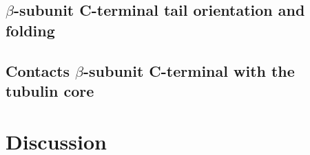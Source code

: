 \documentclass[a4paper]{article}
\begin{document}

\subsection{$\beta$-subunit C-terminal tail orientation and folding}


\subsection{Contacts $\beta$-subunit C-terminal with the tubulin core}


\section{Discussion}
\end{document}

